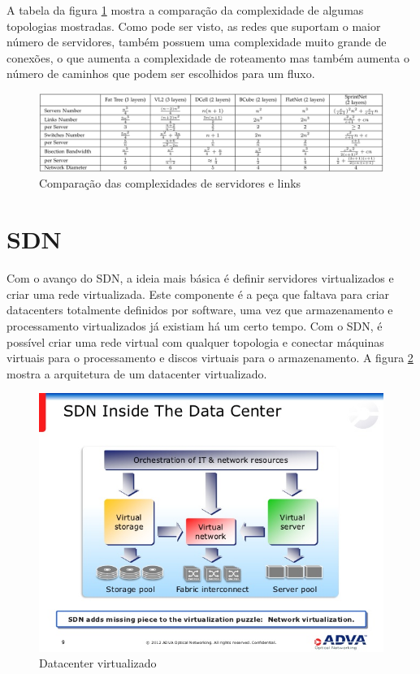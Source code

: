 \documentclass[12pt,a4paper]{report}
\begin{document}
A tabela da figura \ref{comparacao} mostra a comparação da complexidade de algumas topologias mostradas. Como pode ser visto, as redes que suportam o maior número de servidores, também possuem uma complexidade muito grande de conexões, o que aumenta a complexidade de roteamento mas também aumenta o número de caminhos que podem ser escolhidos para um fluxo.\\

\begin{figure}[H]
\centering
\includegraphics[width=1.1\textwidth]{imagens/tabela.png}
\caption{Comparação das complexidades de servidores e links}
\label{comparacao}
\end{figure}

\section{SDN}

Com o avanço do SDN, a ideia mais básica é definir servidores virtualizados e criar uma rede virtualizada. Este componente é a peça que faltava para criar datacenters totalmente definidos por software, uma vez que armazenamento e processamento virtualizados já existiam há um certo tempo. Com o SDN, é possível criar uma rede virtual com qualquer topologia e conectar máquinas virtuais para o processamento e discos virtuais para o armazenamento. A figura \ref{sdn} mostra a arquitetura de um datacenter virtualizado.\\

\begin{figure}[H]
\centering
\includegraphics[width=.8\textwidth]{imagens/inside-sdn.jpg}
\caption{Datacenter virtualizado}
\label{sdn}
\end{figure}
\end{document}
